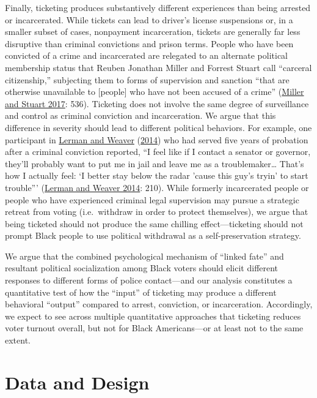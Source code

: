 \documentclass[
  12pt,
]{article}
\begin{document}
Finally, ticketing produces substantively different experiences than being arrested or incarcerated. While tickets can lead to driver's license suspensions or, in a smaller subset of cases, nonpayment incarceration, tickets are generally far less disruptive than criminal convictions and prison terms. People who have been convicted of a crime and incarcerated are relegated to an alternate political membership status that Reuben Jonathan Miller and Forrest Stuart call ``carceral citizenship,'' subjecting them to forms of supervision and sanction ``that are otherwise unavailable to {[}people{]} who have not been accused of a crime'' (\protect\hyperlink{ref-Miller2017}{Miller and Stuart 2017}: 536). Ticketing does not involve the same degree of surveillance and control as criminal conviction and incarceration. We argue that this difference in severity should lead to different political behaviors. For example, one participant in \protect\hyperlink{ref-Lerman2014}{Lerman and Weaver} (\protect\hyperlink{ref-Lerman2014}{2014}) who had served five years of probation after a criminal conviction reported, ``I feel like if I contact a senator or governor, they'll probably want to put me in jail and leave me as a troublemaker\ldots{} That's how I actually feel: `I better stay below the radar 'cause this guy's tryin' to start trouble''' (\protect\hyperlink{ref-Lerman2014}{Lerman and Weaver 2014}: 210). While formerly incarcerated people or people who have experienced criminal legal supervision may pursue a strategic retreat from voting (i.e.~withdraw in order to protect themselves), we argue that being ticketed should not produce the same chilling effect---ticketing should not prompt Black people to use political withdrawal as a self-preservation strategy.

We argue that the combined psychological mechanism of ``linked fate'' and resultant political socialization among Black voters should elicit different responses to different forms of police contact---and our analysis constitutes a quantitative test of how the ``input'' of ticketing may produce a different behavioral ``output'' compared to arrest, conviction, or incarceration. Accordingly, we expect to see across multiple quantitative approaches that ticketing reduces voter turnout overall, but not for Black Americans---or at least not to the same extent.

\hypertarget{data-and-design}{%
\section*{Data and Design}\label{data-and-design}}
\end{document}
